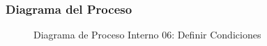 \subsubsection{Diagrama del Proceso}
\begin{figure}[H]
    \centering
        \caption{Diagrama de Proceso Interno 06: Definir Condiciones}%
    \label{fig:process_diagram06}
\end{figure}
\newpage